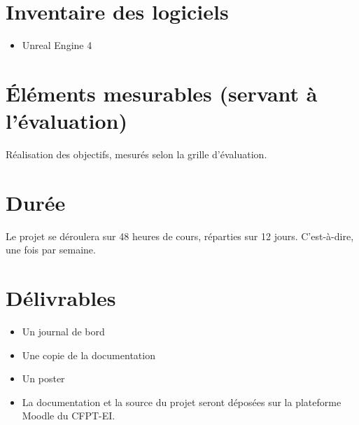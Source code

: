 \documentclass[11pt, a4paper]{article}
\begin{document}
\section{Inventaire des logiciels}
\begin{itemize}
\item Unreal Engine 4
\end{itemize}
\section{Éléments mesurables (servant à l'évaluation)}
Réalisation des objectifs, mesurés selon la grille d'évaluation.
\section{Durée}
Le projet se déroulera sur 48 heures de cours, réparties sur 12 jours. C'est-à-dire, une fois par semaine.
\section{Délivrables}
\begin{itemize}
\item Un journal de bord
\item Une copie de la documentation
\item Un poster
\item La documentation et la source du projet seront déposées sur la plateforme Moodle du CFPT-EI.
\end{itemize}
\end{document}
